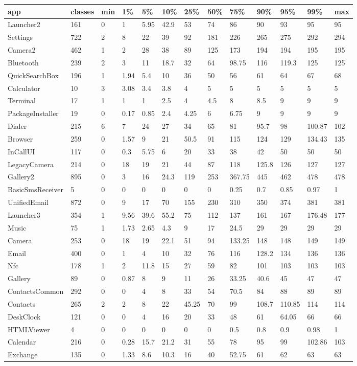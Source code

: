 \begin{tabular}{|l|l|l|l|l|l|l|l|l|l|l|l|l|}
\hline
app&classes&min&1\%&5\%&10\%&25\%&50\%&75\%&90\%&95\%&99\%&max\\
\hline
Launcher2&161&0&1&5.95&42.9&53&74&86&90&93&95&95\\
\hline
Settings&722&2&8&22&39&92&181&226&265&275&292&294\\
\hline
Camera2&462&1&2&28&38&89&125&173&194&194&195&195\\
\hline
Bluetooth&239&2&3&11&18.7&32&64&98.75&116&119.3&125&125\\
\hline
QuickSearchBox&196&1&1.94&5.4&10&36&50&56&61&64&67&68\\
\hline
Calculator&10&3&3.08&3.4&3.8&4&5&5&5&5&5&5\\
\hline
Terminal&17&1&1&1&2.5&4&4.5&8&8.5&9&9&9\\
\hline
PackageInstaller&19&0&0.17&0.85&2.4&4.25&6&6.75&9&9&9&9\\
\hline
Dialer&215&6&7&24&27&34&65&81&95.7&98&100.87&102\\
\hline
Browser&259&0&1.57&9&21&50.5&91&115&124&129&134.43&135\\
\hline
InCallUI&117&0&0.3&5.75&6&20&33&38&42&50&50&50\\
\hline
LegacyCamera&214&0&18&19&21&44&87&118&125.8&126&127&127\\
\hline
Gallery2&895&0&3&16&24.3&119&253&367.75&445&462&478&478\\
\hline
BasicSmsReceiver&5&0&0&0&0&0&0&0.25&0.7&0.85&0.97&1\\
\hline
UnifiedEmail&872&0&9&17&70&155&230&310&350&374&381&381\\
\hline
Launcher3&354&1&9.56&39.6&55.2&75&112&137&161&167&176.48&177\\
\hline
Music&75&1&1.73&2.65&4.3&9&17&24.5&29&29&29&29\\
\hline
Camera&253&0&18&19&22.1&51&94&133.25&148&148&149&149\\
\hline
Email&400&0&1&4&10&32&76&116&128.2&134&136&136\\
\hline
Nfc&178&1&2&11.8&15&27&59&82&101&103&103&103\\
\hline
Gallery&89&0&0.87&8&9&11&26&33.25&40.6&45&47&47\\
\hline
ContactsCommon&292&0&0&4&8&33&54&70.5&84&88&89&89\\
\hline
Contacts&265&2&2&8&22&45.25&70&99&108.7&110.85&114&114\\
\hline
DeskClock&121&0&0&4&16&20&33&48&61&64.05&66&66\\
\hline
HTMLViewer&4&0&0&0&0&0&0&0.5&0.8&0.9&0.98&1\\
\hline
Calendar&216&0&0.28&15.7&21.2&31&55&78&95&99&102.86&103\\
\hline
Exchange&135&0&1.33&8.6&10.3&16&40&52.75&61&62&63&63\\
\hline
\end{tabular}
